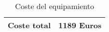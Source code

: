 \begin{table}[h]
    \centering
    \begin{tabular}{|c|c|}
    \hline
    Coste total & 1189 Euros \\ \hline
    \end{tabular}
    \caption {Coste del equipamiento}
\end{table}